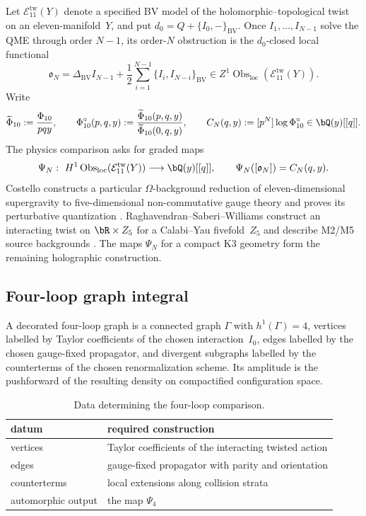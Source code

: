Let $\mathcal E_{11}^{\mathrm{tw}}(Y)$ denote a specified BV model of
the holomorphic--topological twist on an eleven-manifold~$Y$, and put
$d_0=Q+\{I_0,-\}_{\mathrm{BV}}$.  Once
$I_1,\ldots,I_{N-1}$ solve the QME through order $N-1$, its order-$N$
obstruction is the $d_0$-closed local functional
\[
 \mathfrak o_N=
 \Delta_{\mathrm{BV}}I_{N-1}
 +\frac12\sum_{i=1}^{N-1}\{I_i,I_{N-i}\}_{\mathrm{BV}}
 \in Z^1\operatorname{Obs}_{\mathrm{loc}}
       (\mathcal E_{11}^{\mathrm{tw}}(Y)).
\]
Write
\[
 \widetilde\Phi_{10}:=\frac{\Phi_{10}}{pqy},\qquad
 \Phi_{10}^{\circ}(p,q,y):=
 \frac{\widetilde\Phi_{10}(p,q,y)}
      {\widetilde\Phi_{10}(0,q,y)},\qquad
 C_N(q,y):=[p^N]\log\Phi_{10}^{\circ}
 \in\bQ(y)[[q]].
\]
The physics comparison asks for graded maps
\[
 \Psi_N:\ H^1\operatorname{Obs}_{\mathrm{loc}}
       (\mathcal E_{11}^{\mathrm{tw}}(Y))
 \longrightarrow \bQ(y)[[q]],
 \qquad \Psi_N([\mathfrak o_N])=C_N(q,y).
\]
Costello constructs a particular $\Omega$-background reduction of
eleven-dimensional supergravity to five-dimensional non-commutative
gauge theory and proves its perturbative quantization
\cite[Thms.~9.0.2--9.0.3]{Costello2111}.  Raghavendran--Saberi--Williams
construct an interacting twist on $\bR\times Z_5$ for a Calabi--Yau
fivefold~$Z_5$ and describe M2/M5 source backgrounds
\cite{RSW23}.  The maps $\Psi_N$ for a compact K3 geometry form the
remaining holographic construction.

\subsection{Four-loop graph integral}
\label{subsec:bvbrst-4loop-enumeration}

\begin{definition}
\label{def:bvbrst-4loop-diagram}
A decorated four-loop graph is a connected graph $\Gamma$ with
$h^1(\Gamma)=4$, vertices labelled by Taylor coefficients of the
chosen interaction~$I_0$, edges labelled by the chosen gauge-fixed
propagator, and divergent subgraphs labelled by the counterterms of
the chosen renormalization scheme.  Its amplitude is the pushforward
of the resulting density on compactified configuration space.
\end{definition}

\begin{table}[ht]
\centering
\begin{tabular}{@{}ll@{}}
\toprule
datum & required construction \\
\midrule
vertices & Taylor coefficients of the interacting twisted action \\
edges & gauge-fixed propagator with parity and orientation \\
counterterms & local extensions along collision strata \\
automorphic output & the map $\Psi_4$ \\
\bottomrule
\end{tabular}
\caption{Data determining the four-loop comparison.}
\label{tab:bvbrst-4loop-enum}
\end{table}

